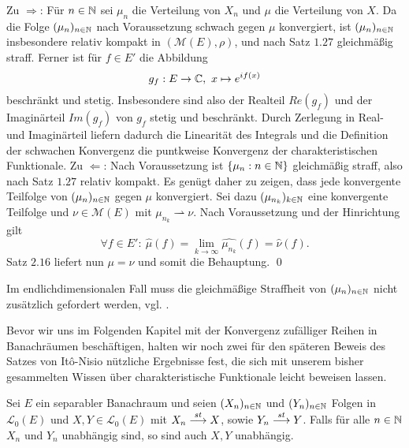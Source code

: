 \begin{proof*}
    Zu $\Rightarrow$: Für $n \in \mathbb{N}$ sei $\mu_n$ die Verteilung von $X_n$ und $\mu$ die Verteilung von $X$. Da die Folge $(\mu_n)_{n \in \mathbb{N}}$ nach Voraussetzung schwach gegen $\mu$ konvergiert, 
    ist $(\mu_n)_{n \in  \mathbb{N}}$ insbesondere relativ kompakt in $(\mathcal{M}(E), \rho)$, und nach Satz $1.27$ gleichmäßig straff. 
    Ferner ist für $f \in E'$ die Abbildung 
    $$
        g_f: E \to \mathbb{C},  \ x \mapsto e^{if(x)}
    $$ 
    beschränkt und stetig. Insbesondere sind also der Realteil $Re(g_f)$ und der Imaginärteil $Im(g_f)$ von $g_f$ stetig und beschränkt. 
    Durch Zerlegung in Real- und Imaginärteil liefern dadurch die Linearität des Integrals und die Definition der schwachen Konvergenz die puntkweise Konvergenz der charakteristischen Funktionale. 
    \newline 
    Zu $\Leftarrow$: Nach Voraussetzung ist  $\{\mu_n : n \in \mathbb{N}\}$ gleichmäßig straff, also nach Satz $1.27$ relativ kompakt. Es genügt daher zu zeigen, dass jede konvergente Teilfolge von $(\mu_n)_{n \in \mathbb{N}}$ gegen $\mu$ konvergiert. 
    Sei dazu $(\mu_{n_k})_{k \in \mathbb{N}}$ eine konvergente Teilfolge und $\nu \in \mathcal{M}(E)$ mit $\mu_{n_k} \rightharpoonup \nu$. Nach Voraussetzung und der Hinrichtung gilt 
    $$
        \forall f \in E': \ \widehat{\mu}(f) = \lim_{k \to \infty} \widehat{\mu_{n_k}}(f) = \widehat{\nu}(f).
    $$
    Satz $2.16$ liefert nun $\mu = \nu$ und somit die Behauptung. \qed
\end{proof*}

\begin{remark}
    Im endlichdimensionalen Fall muss die gleichmäßige Straffheit von $(\mu_n)_{n \in \mathbb{N}}$ nicht zusätzlich gefordert werden, vgl. \cite[Satz 8.7.5]{gs}. 
\end{remark}

Bevor wir uns im Folgenden Kapitel mit der Konvergenz zufälliger Reihen in Banachräumen beschäftigen, halten wir noch zwei für den späteren Beweis des Satzes von Itô-Nisio nützliche Ergebnisse fest, die sich mit unserem bisher gesammelten Wissen über charakteristische Funktionale leicht beweisen lassen.  

\begin{proposition}
    Sei $E$ ein separabler Banachraum und seien $(X_n)_{n \in \mathbb{N}}$ und $(Y_n)_{n \in \mathbb{N}}$ Folgen in $\mathcal{L}_0(E)$ und $X,Y \in \mathcal{L}_0(E)$ mit $X_n \overset{st}{\longrightarrow} X$, sowie $Y_n \overset{st}{\longrightarrow} Y$. 
    Falls für alle $n \in \mathbb{N}$ $X_n$ und $Y_n$ unabhängig sind, so sind auch $X,Y$ unabhängig. 
\end{proposition}


